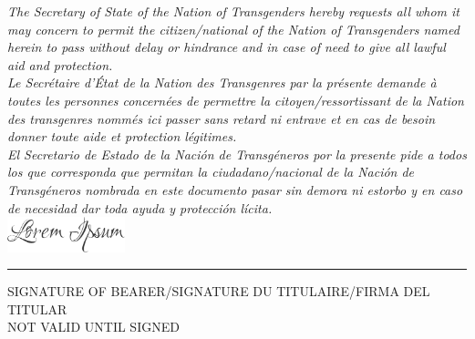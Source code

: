 \newpage
{}
\begin{landscape}
    \begin{center}
        \begin{minipage}{0.8\linewidth}
            \itshape\selectfont
            \centering
            \scriptsize
            The Secretary of State of the Nation of Transgenders hereby requests all whom it may concern to permit the citizen/national of the Nation of Transgenders named herein to pass without delay or hindrance and in case of need to give all lawful aid and protection.\\
            \vspace{0.2in}
            Le Secrétaire d'État de la Nation des Transgenres par la présente demande à toutes les personnes concernées de permettre la citoyen/ressortissant de la Nation des transgenres nommés ici passer sans retard ni entrave et en cas de besoin donner toute aide et protection légitimes.\\
            \vspace{0.2in}
            El Secretario de Estado de la Nación de Transgéneros por la presente pide a todos los que corresponda que permitan la ciudadano/nacional de la Nación de Transgéneros nombrada en este documento pasar sin demora ni estorbo y en caso de necesidad dar toda ayuda y protección lícita.\\
            \vspace{0.1in}
            \includegraphics[height=0.4in]{images/signature.png}
            \vspace{-0.1in}
        \end{minipage}
        \hrule
        \vspace{0.1in}
        \tiny
        SIGNATURE OF BEARER/SIGNATURE DU TITULAIRE/FIRMA DEL TITULAR
        \\
        \vspace{0.1in}
        {\sffamily \small \color{Blue} NOT VALID UNTIL SIGNED}
    \end{center}
\end{landscape}
\restoregeometry